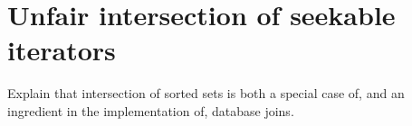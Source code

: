 \documentclass[acmsmall,screen,review,anonymous,dvipsnames]{acmart}
\newcommand\todo[1]{{\color{Orange}#1}}
\begin{document}











\section{Unfair intersection of seekable iterators}

\todo{Explain that intersection of sorted sets is both a special case of, and an ingredient in the implementation of, database joins.}
\end{document}
